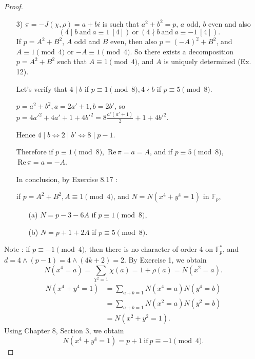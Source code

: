 \documentclass[11pt,a4paper]{article}
\newcommand{\Z}{\mathbb{Z}}
\newcommand{\F}{\mathbb{F}}
\newcommand{\re}{\,\mathrm{Re}\,}
\begin{document}
{\begin{proof}
\begin{enumerate}
$a + bi \equiv 1 \pmod {2+2i}$, thus $a+bi \equiv 1 \pmod 2$, so that $a$ is odd, and $b$ is even.

$\bullet$ If $4 \mid b$, then $2+2i \mid b$.

Therefore $a \equiv 1 \pmod {2+2i}$, and by complex conjugation, $a\equiv 1 \pmod{2-2i}$, so $(2+2i)(2-2i) = 8 \mid (a-1)^2$, thus $4 \mid a-1$.

$\bullet$ If $4 \nmid b$, then $b = 4k+2, k\in \Z$.

Therefore, $1 \equiv a+bi \equiv a +2i \pmod{2+2i}$. As $2i \equiv -2 \pmod{2+2i}$, $a\equiv 3 \equiv -1 \pmod {2+2i}$.
By conjugation, $a \equiv -1 \pmod{2-2i}$. Multiplying these congruences, we obtain $8 \mid (a+1)^2$, thus $a \equiv -1 \pmod 4$.

\item[3)] $\pi = -J(\chi,\rho) = a + bi$ is such that  $a^2+b^2 = p$, $a$ odd, $b$ even and also
$$(4 \mid b \ \mathrm{and} \ a\equiv 1\ [4]) \ \mathrm{or}\ (4\nmid b\ \mathrm{and}\ a\equiv -1 \ [4]).$$
If $p = A^2+B^2$, $A$ odd and $B$ even, then also $p = (-A)^2 + B^2$, and $A \equiv 1 \pmod 4$ or $-A \equiv 1 \pmod 4$. So there exists a decomposition $p = A^2+B^2$ such that $A\equiv1 \pmod 4$, and $A$ is uniquely determined (Ex. 12).

Let's verify that $4 \mid b$ if $p \equiv 1 \pmod 8, 4 \nmid b$ if $p \equiv 5 \pmod 8$.

$p = a^2 +b^2, a = 2a'+1, b = 2b'$, so $p = 4a'^2 + 4a'+1 + 4b'^2 = 8 \frac{a'(a'+1)}{2} + 1 + 4b'^2$.

Hence $4 \mid b \iff 2 \mid b' \iff 8 \mid p-1$.

Therefore if $p\equiv 1 \pmod 8$, $\re \pi = a = A$, and if $p\equiv 5 \pmod 8$, $\re \pi = a = -A$.

In conclusion, by Exercise 8.17 :

 if $p = A^2+B^2, A\equiv1 \pmod 4$, and $N =N(x^4+y^4 = 1)$ in $\F_p$,
\begin{enumerate}
\item[(a)] $N = p-3 -6A$ if $p\equiv 1 \pmod 8$,
\item[(b)] $N = p+1 + 2A$ if $p \equiv 5 \pmod 8$.
\end{enumerate}
\end{enumerate}


Note : if $p\equiv -1 \pmod 4$, then there is no character of order 4 on $\F_p^*$,  and $d = 4 \wedge (p-1) = 4 \wedge (4k+2) = 2$. By Exercise 1, we obtain
$$N(x^4 = a) = \sum_{\chi^2 = 1} \chi(a) = 1 + \rho(a) = N(x^2 = a).$$
\begin{align*}
N(x^4+y^4 = 1) &= \sum_{a+b=1} N(x^4 = a) N(y^4=b)\\
&= \sum_{a+b=1} N(x^2=a) N(y^2=b)\\
&=N(x^2+y^2=1).
\end{align*}
Using Chapter 8, Section 3, we obtain
$$N(x^4+y^4=1) = p+1 \ \mathrm{if} \ p\equiv -1 \pmod 4.$$
\end{proof}

}
\end{document}
